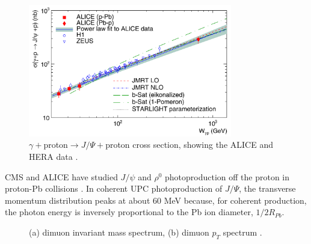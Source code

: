 \begin{figure}[h!]
\begin{centering}
\includegraphics[width=3.5in]{Chapter2/importfigs/alice_jpsi_data.png}
\par\end{centering}
\caption{$\gamma +$proton$\rightarrow J/\Psi +$proton cross section, showing the ALICE and HERA data \cite{Klein:2017nqo}. \label{fig:aliceData1}}
\end{figure}

CMS and ALICE have studied $J/\psi$ and $\rho^0$ photoproduction off the proton in proton-Pb collisions \cite{TheALICE:2014dwa}. In coherent UPC photoproduction of $J/\Psi$, the transverse momentum distribution peaks at about 60 MeV because, for coherent production, the photon energy is inversely proportional to the Pb ion diameter, $1/2R_{Pb}$.

\begin{figure}%
    \centering
    \qquad
    \caption{(a) dimuon invariant mass spectrum, (b) dimuon $p_T$ spectrum \cite{Khachatryan:2016qhq}.}%
    \label{fig:patKennyPlots}%
\end{figure}


